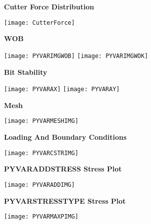 \documentclass[20pt]{extreport}
\begin{document}
\newpage   %
\flushleft
{\LARGE\color{Blue}\textbf {Cutter Force Distribution}}
\noindent {\color{OliveGreen} \rule{\linewidth}{0.125in}}
\begin{center}
\texttt{[image: CutterForce]}
\end{center}


\newpage   %
\flushleft
{\LARGE\color{Blue}\textbf {WOB}}
\noindent {\color{OliveGreen} \rule{\linewidth}{0.125in}}
\begin{center}
\texttt{[image: PYVARIMGWOB]}
\texttt{[image: PYVARIMGWOK]}
\end{center}


\newpage   %
\flushleft
{\LARGE\color{Blue}\textbf {Bit Stability}}
\noindent {\color{OliveGreen} \rule{\linewidth}{0.125in}}
\begin{center}
\texttt{[image: PYVARAX]}
\texttt{[image: PYVARAY]}
\end{center}


\newpage   %
\flushleft
{\LARGE\color{Blue}\textbf {Mesh}}
\noindent {\color{OliveGreen} \rule{\linewidth}{0.125in}}
\begin{center}
\texttt{[image: PYVARMESHIMG]}
\end{center}


\newpage   %
\flushleft
{\LARGE\color{Blue}\textbf {Loading And Boundary Conditions}}
\noindent {\color{OliveGreen} \rule{\linewidth}{0.125in}}
\begin{center}
\texttt{[image: PYVARCSTRIMG]}
\end{center}

\newpage   %
\flushleft
{\LARGE\color{Blue}\textbf {PYVARADDSTRESS Stress Plot}}
\noindent {\color{OliveGreen} \rule{\linewidth}{0.125in}}
\vspace{0.1in}
\begin{center}
\texttt{[image: PYVARADDIMG]}
\end{center}

\newpage   %
\flushleft
{\LARGE\color{Blue}\textbf {PYVARSTRESSTYPE Stress Plot}}
\noindent {\color{OliveGreen} \rule{\linewidth}{0.125in}}
\vspace{0.1in}
\begin{center}
\texttt{[image: PYVARMAXPIMG]}
\end{center}
\end{document}
